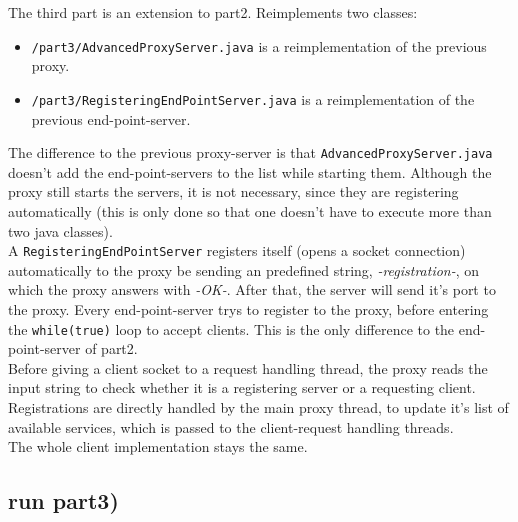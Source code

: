 \documentclass{article}
\begin{document}
    The third part is an extension to part2. Reimplements two classes:
    \begin{itemize}
      \item \texttt{/part3/AdvancedProxyServer.java} is a reimplementation of the previous proxy.
      \item \texttt{/part3/RegisteringEndPointServer.java} is a reimplementation of the previous end-point-server.
    \end{itemize}
	The difference to the previous proxy-server is that \texttt{AdvancedProxyServer.java} doesn't add the end-point-servers to the list while starting them. Although the proxy still starts the servers, it is not necessary, since they are registering automatically (this is only done so that one doesn't have to execute more than two java classes).\\
	A \texttt{RegisteringEndPointServer} registers itself (opens a socket connection) automatically to the proxy be sending an predefined string, \textit{-registration-}, on which the proxy answers with \textit{-OK-}. After that, the server will send it's port to the proxy. Every end-point-server trys to register to the proxy, before entering the \texttt{while(true)} loop to accept clients. This is the only difference to the end-point-server of part2.\\
	Before giving a client socket to a request handling thread, the proxy reads the input string to check whether it is a registering server or a requesting client. Registrations are directly handled by the main proxy thread, to update it's list of available services, which is passed to the client-request handling threads.\\
	The whole client implementation stays the same.
  
    \subsection*{run part3)}
      
\end{document}
